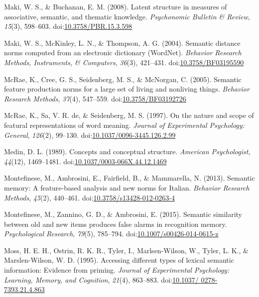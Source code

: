 \documentclass[english,,man]{apa6}
\theoremstyle{definition}
\theoremstyle{definition}
\theoremstyle{definition}
\theoremstyle{remark}
\begin{document}
\leavevmode\hypertarget{ref-Maki2008}{}%
Maki, W. S., \& Buchanan, E. M. (2008). Latent structure in measures of
associative, semantic, and thematic knowledge. \emph{Psychonomic
Bulletin \& Review}, \emph{15}(3), 598--603.
doi:\href{https://doi.org/10.3758/PBR.15.3.598}{10.3758/PBR.15.3.598}

\leavevmode\hypertarget{ref-Maki2004}{}%
Maki, W. S., McKinley, L. N., \& Thompson, A. G. (2004). Semantic
distance norms computed from an electronic dictionary (WordNet).
\emph{Behavior Research Methods, Instruments, \& Computers},
\emph{36}(3), 421--431.
doi:\href{https://doi.org/10.3758/BF03195590}{10.3758/BF03195590}

\leavevmode\hypertarget{ref-McRae2005}{}%
McRae, K., Cree, G. S., Seidenberg, M. S., \& McNorgan, C. (2005).
Semantic feature production norms for a large set of living and
nonliving things. \emph{Behavior Research Methods}, \emph{37}(4),
547--559.
doi:\href{https://doi.org/10.3758/BF03192726}{10.3758/BF03192726}

\leavevmode\hypertarget{ref-McRae1997}{}%
McRae, K., Sa, V. R. de, \& Seidenberg, M. S. (1997). On the nature and
scope of featural representations of word meaning. \emph{Journal of
Experimental Psychology: General}, \emph{126}(2), 99--130.
doi:\href{https://doi.org/10.1037/0096-3445.126.2.99}{10.1037/0096-3445.126.2.99}

\leavevmode\hypertarget{ref-Medin1989}{}%
Medin, D. L. (1989). Concepts and conceptual structure. \emph{American
Psychologist}, \emph{44}(12), 1469--1481.
doi:\href{https://doi.org/10.1037/0003-066X.44.12.1469}{10.1037/0003-066X.44.12.1469}

\leavevmode\hypertarget{ref-Montefinese2013}{}%
Montefinese, M., Ambrosini, E., Fairfield, B., \& Mammarella, N. (2013).
Semantic memory: A feature-based analysis and new norms for Italian.
\emph{Behavior Research Methods}, \emph{45}(2), 440--461.
doi:\href{https://doi.org/10.3758/s13428-012-0263-4}{10.3758/s13428-012-0263-4}

\leavevmode\hypertarget{ref-Montefinese2015}{}%
Montefinese, M., Zannino, G. D., \& Ambrosini, E. (2015). Semantic
similarity between old and new items produces false alarms in
recognition memory. \emph{Psychological Research}, \emph{79}(5),
785--794.
doi:\href{https://doi.org/10.1007/s00426-014-0615-z}{10.1007/s00426-014-0615-z}

\leavevmode\hypertarget{ref-Moss1995}{}%
Moss, H. E. H., Ostrin, R. K. R., Tyler, I., Marlsen-Wilson, W., Tyler,
L. K., \& Marslen-Wilson, W. D. (1995). Accessing different types of
lexical semantic information: Evidence from priming. \emph{Journal of
Experimental Psychology: Learning, Memory, and Cognition}, \emph{21}(4),
863--883.
doi:\href{https://doi.org/10.1037/\%200278-7393.21.4.863}{10.1037/ 0278-7393.21.4.863}
\end{document}
